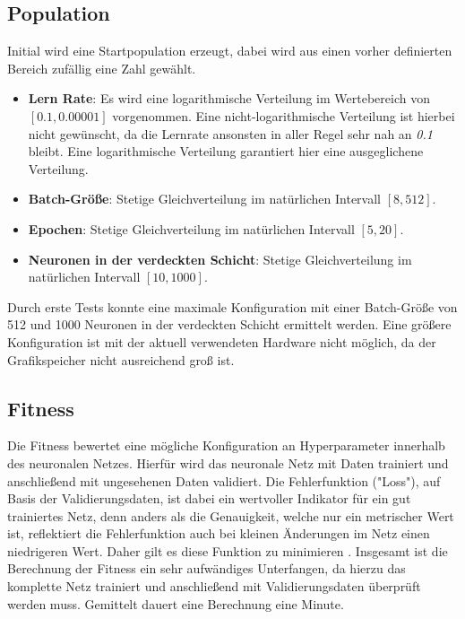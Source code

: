 \subsection{Population}
Initial wird eine Startpopulation erzeugt, dabei wird aus einen vorher definierten Bereich zufällig eine Zahl gewählt.
\begin{itemize}
	\item \textbf{Lern Rate}: Es wird eine logarithmische Verteilung im Wertebereich von \(\left[ 0.1, 0.00001 \right]\) vorgenommen. Eine nicht-logarithmische Verteilung ist hierbei nicht gewünscht, da die Lernrate ansonsten in aller Regel sehr nah an \textit{0.1} bleibt. Eine logarithmische Verteilung garantiert hier eine ausgeglichene Verteilung.
	\item \textbf{Batch-Größe}: Stetige Gleichverteilung im natürlichen Intervall \(\left[ 8, 512 \right]\). 
	\item \textbf{Epochen}: Stetige Gleichverteilung im natürlichen Intervall \(\left[ 5, 20 \right]\). 
	\item \textbf{Neuronen in der verdeckten Schicht}: Stetige Gleichverteilung im natürlichen Intervall \(\left[ 10, 1000 \right]\). 
\end{itemize}
Durch erste Tests konnte eine maximale Konfiguration mit einer Batch-Größe von 512 und 1000 Neuronen in der verdeckten Schicht ermittelt werden. Eine größere Konfiguration ist mit der aktuell verwendeten Hardware nicht möglich, da der Grafikspeicher nicht ausreichend groß ist.

\subsection{Fitness}
Die Fitness bewertet eine mögliche Konfiguration an Hyperparameter innerhalb des neuronalen Netzes. Hierfür wird das neuronale Netz mit Daten trainiert und anschließend mit ungesehenen Daten validiert. Die Fehlerfunktion ("Loss"), auf Basis der Validierungsdaten, ist dabei ein wertvoller Indikator für ein gut trainiertes Netz, denn anders als die Genauigkeit, welche nur ein metrischer Wert ist, reflektiert die Fehlerfunktion auch bei kleinen Änderungen im Netz einen niedrigeren Wert. Daher gilt es diese Funktion zu minimieren \parencite[Kapitel~4.3]{goodfellow_deep_2016}. Insgesamt ist die Berechnung der Fitness ein sehr aufwändiges Unterfangen, da hierzu das komplette Netz trainiert und anschließend mit Validierungsdaten überprüft werden muss. Gemittelt dauert eine Berechnung eine Minute.

